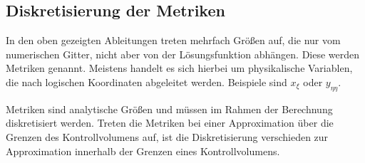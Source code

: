 \subsection{Diskretisierung der Metriken}
\label{sec:verz-metrik}

In den oben gezeigten Ableitungen treten mehrfach Größen auf, die nur vom numerischen Gitter, nicht aber
von der Lösungsfunktion abhängen. Diese werden Metriken genannt.
Meistens handelt es sich hierbei um physikalische Variablen, die nach logischen Koordinaten abgeleitet werden.
Beispiele sind $x_{\xi}$ oder $y_{\eta\eta}$.

Metriken sind analytische Größen und müssen im Rahmen der Berechnung diskretisiert werden.
Treten die Metriken bei einer Approximation über die Grenzen des Kontrollvolumens auf,
ist die Diskretisierung verschieden zur Approximation innerhalb der Grenzen eines Kontrollvolumens.

